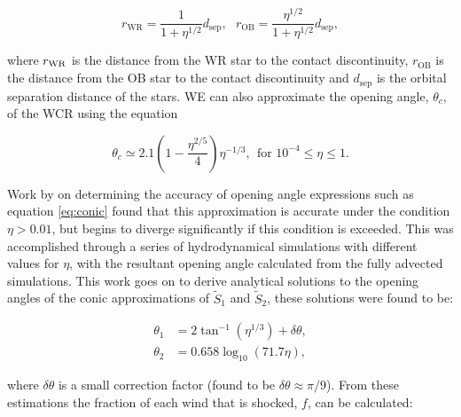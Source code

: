 \begin{equation}
  r_\text{WR} = \frac{1}{1+\eta^{1/2}} d_\text{sep} , ~~~ r_\text{OB} = \frac{\eta^{1/2}}{1+\eta^{1/2}} d_\text{sep} ,
\end{equation}

\noindent
where $r_\text{WR}$ is the distance from the WR star to the contact discontinuity, $r_\text{OB}$ is the distance from the OB star to the contact discontinuity and $d_\text{sep}$ is the orbital separation distance of the stars.
WE can also approximate the opening angle, $\theta_c$, of the WCR using the equation 

\begin{equation}
  \theta_c \simeq 2.1 \left(1 - \frac{\eta^{2/5}}{4}\right) \eta^{-1/3}, ~~ \text{for } 10^{-4} \leq \eta \leq 1. \label{eq:conic}
\end{equation}



\noindent
Work by \textcite{pittardCollidingStellarWinds2018} on determining the accuracy of opening angle expressions such as equation \ref{eq:conic} found that this approximation is accurate under the condition $\eta > 0.01$, but begins to diverge significantly if this condition is exceeded.
This was accomplished through a series of hydrodynamical simulations with different values for $\eta$, with the resultant opening angle calculated from the fully advected simulations.
This work goes on to derive analytical solutions to the opening angles of the conic approximations of $\widetilde{S}_1$ and $\widetilde{S}_2$, these solutions were found to be:

\begin{subequations}
  \begin{align}
    \theta_1 & = 2 \tan^{-1} \left(\eta^{1/3}\right) + \delta \theta , \\
    \theta_2 & = 0.658 \log_{10} \left(71.7 \eta \right) ,
  \end{align}
\end{subequations}

\noindent
where $\delta \theta$ is a small correction factor (found to be $\delta \theta \approx \pi/9$).
From these estimations the fraction of each wind that is shocked, $f$, can be calculated:

